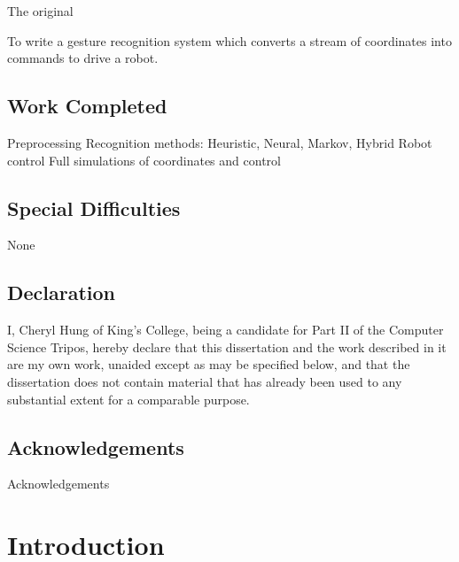 \documentclass[12pt,a4,notitlepage]{report}
\renewcommand{\_}{\texttt{\symbol{95}}}
\newcommand{\<}{\texttt{\symbol{60}}}
\renewcommand{\>}{\texttt{\symbol{62}}}
\begin{document}
The original 

To write a gesture recognition system which converts a stream of coordinates into commands to drive a robot.

\section*{Work Completed}

Preprocessing
Recognition methods: Heuristic, Neural, Markov, Hybrid
Robot control
Full simulations of coordinates and control

\section*{Special Difficulties}

None
 
\newpage
\section*{Declaration}

I, Cheryl Hung of King's College, being a candidate for Part II of the Computer Science Tripos, hereby declare that this dissertation and the work described in it are my own work, unaided except as may be specified below, and that the dissertation does not contain material that has already been used to any substantial extent for a comparable purpose.

\bigskip
{}

\medskip
{}

\cleardoublepage

\tableofcontents

\listoffigures

\newpage
\section*{Acknowledgements}

Acknowledgements


\cleardoublepage        %

\setcounter{page}{1}
\pagestyle{headings}

\chapter{Introduction}
\end{document}
